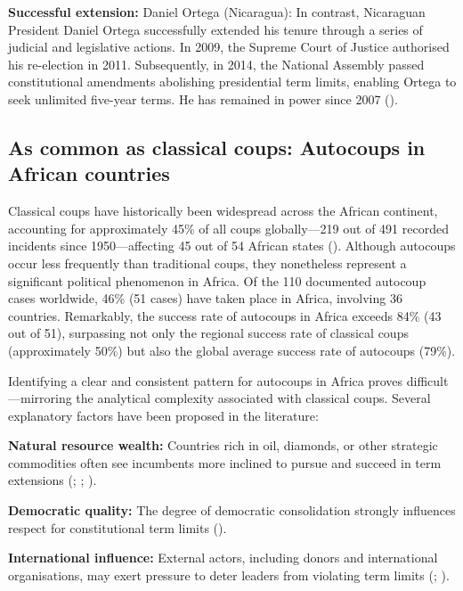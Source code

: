 \documentclass[
  12pt,
]{report}
\begin{document}
\textbf{Successful extension:} Daniel Ortega (Nicaragua): In contrast,
Nicaraguan President Daniel Ortega successfully extended his tenure
through a series of judicial and legislative actions. In 2009, the
Supreme Court of Justice authorised his re-election in 2011.
Subsequently, in 2014, the National Assembly passed constitutional
amendments abolishing presidential term limits, enabling Ortega to seek
unlimited five-year terms. He has remained in power since 2007
().

\subsection{As common as classical coups: Autocoups in African
countries}\label{as-common-as-classical-coups-autocoups-in-african-countries}

Classical coups have historically been widespread across the African
continent, accounting for approximately 45\% of all coups globally---219
out of 491 recorded incidents since 1950---affecting 45 out of 54
African states ().
Although autocoups occur less frequently than traditional coups, they
nonetheless represent a significant political phenomenon in Africa. Of
the 110 documented autocoup cases worldwide, 46\% (51 cases) have taken
place in Africa, involving 36 countries. Remarkably, the success rate of
autocoups in Africa exceeds 84\% (43 out of 51), surpassing not only the
regional success rate of classical coups (approximately 50\%) but also
the global average success rate of autocoups (79\%).

Identifying a clear and consistent pattern for autocoups in Africa
proves difficult---mirroring the analytical complexity associated with
classical coups. Several explanatory factors have been proposed in the
literature:

\textbf{Natural resource wealth:} Countries rich in oil, diamonds, or
other strategic commodities often see incumbents more inclined to pursue
and succeed in term extensions (; ;
).

\textbf{Democratic quality:} The degree of democratic consolidation
strongly influences respect for constitutional term limits
().

\textbf{International influence:} External actors, including donors and
international organisations, may exert pressure to deter leaders from
violating term limits (;
).
\end{document}
